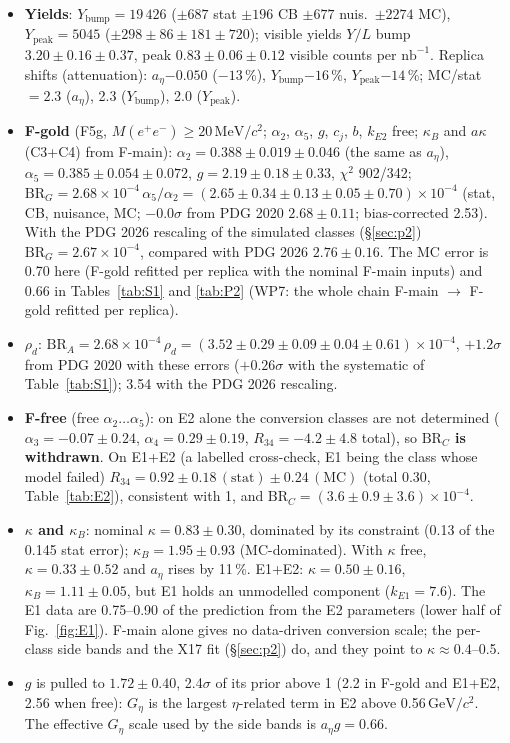 \documentclass[11pt,a4paper]{article}
\newcommand{\Mee}{\ensuremath{M(e^{+}e^{-})}\xspace}
\newcommand{\nbinv}{\ensuremath{\mathrm{nb}^{-1}}\xspace}
\newcommand{\GeVcc}{\ensuremath{\mathrm{GeV}/c^{2}}\xspace}
\newcommand{\MeVcc}{\ensuremath{\mathrm{MeV}/c^{2}}\xspace}
\newcommand{\aEta}{\ensuremath{a_\eta}\xspace}
\newcommand{\Ybump}{\ensuremath{Y_{\mathrm{bump}}}\xspace}
\newcommand{\Ypeak}{\ensuremath{Y_{\mathrm{peak}}}\xspace}
\newcommand{\kB}{\ensuremath{\kappa_B}\xspace}
\newcommand{\rhod}{\ensuremath{\rho_d}\xspace}
\newcommand{\kEone}{\ensuremath{k_{E1}}\xspace}
\newcommand{\kEtwo}{\ensuremath{k_{E2}}\xspace}
\newcommand{\BRG}{\ensuremath{\mathrm{BR}_G}\xspace}
\newcommand{\BRA}{\ensuremath{\mathrm{BR}_A}\xspace}
\newcommand{\BRC}{\ensuremath{\mathrm{BR}_C}\xspace}
\newcommand{\Geta}{\ensuremath{G_\eta}\xspace}
\begin{document}
\begin{itemize}\setlength{\itemsep}{0pt}
\item \textbf{Yields}: $\Ybump=19\,426$ ($\pm687$ stat $\pm196$ CB $\pm677$ nuis.\ $\pm2274$ MC), $\Ypeak=5045$ ($\pm298\pm86\pm181\pm720$);
      visible yields $Y/L$ bump $3.20\pm0.16\pm0.37$, peak $0.83\pm0.06\pm0.12$ visible counts per \nbinv. Replica shifts (attenuation): \aEta $-0.050$
      ($-13$\,\%), \Ybump $-16$\,\%, \Ypeak $-14$\,\%; MC/stat $=2.3$ (\aEta), 2.3 (\Ybump), 2.0 (\Ypeak).
\item \textbf{F-gold} (F5g, \Mee$\ge20$\,\MeVcc; $\alpha_2$, $\alpha_5$, $g$, $c_j$, $b$, \kEtwo free; \kB and $a\kappa$(C3+C4) from F-main):
      $\alpha_2=0.388\pm0.019\pm0.046$ (the same as \aEta), $\alpha_5=0.385\pm0.054\pm0.072$, $g=2.19\pm0.18\pm0.33$, $\chi^2$ 902/342;
      $\BRG=2.68\times10^{-4}\,\alpha_5/\alpha_2=(2.65\pm0.34\pm0.13\pm0.05\pm0.70)\times10^{-4}$ (stat, CB, nuisance, MC; $-0.0\sigma$ from PDG 2020
      $2.68\pm0.11$; bias-corrected 2.53). With the PDG 2026 rescaling of the simulated classes (\S\ref{sec:p2}) $\BRG=2.67\times10^{-4}$, compared
      with PDG 2026 $2.76\pm0.16$. The MC error is 0.70 here (F-gold refitted per replica with the nominal F-main inputs) and 0.66 in
      Tables~\ref{tab:S1} and \ref{tab:P2} (WP7: the whole chain F-main $\to$ F-gold refitted per replica).
\item \textbf{\rhod}: $\BRA=2.68\times10^{-4}\,\rhod=(3.52\pm0.29\pm0.09\pm0.04\pm0.61)\times10^{-4}$, $+1.2\sigma$ from PDG 2020 with these errors
      ($+0.26\sigma$ with the systematic of Table~\ref{tab:S1}); 3.54 with the PDG 2026 rescaling.
\item \textbf{F-free} (free $\alpha_2\dots\alpha_5$): on E2 alone the conversion classes are not determined ($\alpha_3=-0.07\pm0.24$,
      $\alpha_4=0.29\pm0.19$, $R_{34}=-4.2\pm4.8$ total), so \textbf{\BRC is withdrawn}. On E1+E2 (a labelled cross-check, E1 being the class
      whose model failed) $R_{34}=0.92\pm0.18\,(\mathrm{stat})\pm0.24\,(\mathrm{MC})$ (total 0.30, Table~\ref{tab:E2}), consistent with 1, and
      $\BRC=(3.6\pm0.9\pm3.6)\times10^{-4}$.
\item \textbf{$\kappa$ and \kB}: nominal $\kappa=0.83\pm0.30$, dominated by its constraint (0.13 of the 0.145 stat error); \kB $=1.95\pm0.93$
      (MC-dominated). With $\kappa$ free, $\kappa=0.33\pm0.52$ and \aEta rises by 11\,\%. E1+E2: $\kappa=0.50\pm0.16$, $\kB=1.11\pm0.05$, but E1
      holds an unmodelled component (\kEone$=7.6$). The E1 data are 0.75--0.90 of the prediction from the E2 parameters (lower half of
      Fig.~\ref{fig:E1}). F-main alone gives no data-driven conversion scale; the per-class side bands and the X17 fit (\S\ref{sec:p2}) do,
      and they point to $\kappa\approx0.4$--0.5.
\item \textbf{$g$} is pulled to $1.72\pm0.40$, 2.4$\sigma$ of its prior above 1 (2.2 in F-gold and E1+E2, 2.56 when free): \Geta is the
      largest $\eta$-related term in E2 above 0.56\,\GeVcc. The effective \Geta scale used by the side bands is $\aEta g=0.66$.
\end{itemize}
\end{document}
